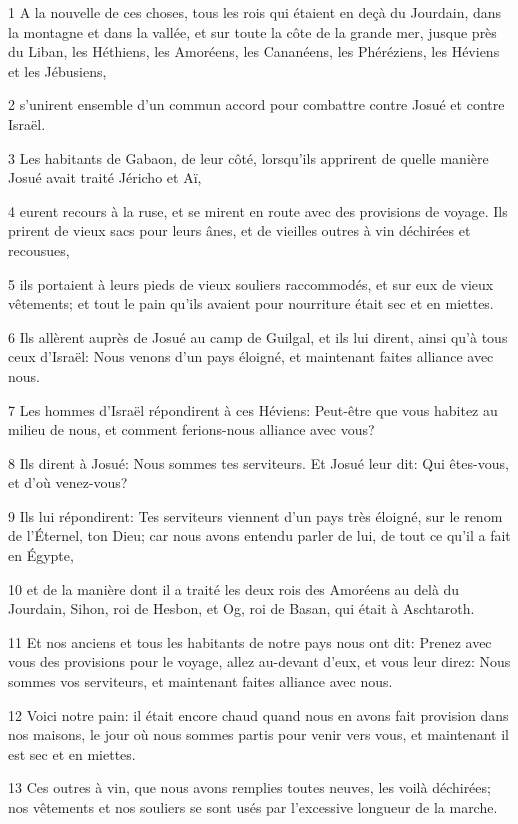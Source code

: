 \par 1 A la nouvelle de ces choses, tous les rois qui étaient en deçà du Jourdain, dans la montagne et dans la vallée, et sur toute la côte de la grande mer, jusque près du Liban, les Héthiens, les Amoréens, les Cananéens, les Phéréziens, les Héviens et les Jébusiens,
\par 2 s'unirent ensemble d'un commun accord pour combattre contre Josué et contre Israël.
\par 3 Les habitants de Gabaon, de leur côté, lorsqu'ils apprirent de quelle manière Josué avait traité Jéricho et Aï,
\par 4 eurent recours à la ruse, et se mirent en route avec des provisions de voyage. Ils prirent de vieux sacs pour leurs ânes, et de vieilles outres à vin déchirées et recousues,
\par 5 ils portaient à leurs pieds de vieux souliers raccommodés, et sur eux de vieux vêtements; et tout le pain qu'ils avaient pour nourriture était sec et en miettes.
\par 6 Ils allèrent auprès de Josué au camp de Guilgal, et ils lui dirent, ainsi qu'à tous ceux d'Israël: Nous venons d'un pays éloigné, et maintenant faites alliance avec nous.
\par 7 Les hommes d'Israël répondirent à ces Héviens: Peut-être que vous habitez au milieu de nous, et comment ferions-nous alliance avec vous?
\par 8 Ils dirent à Josué: Nous sommes tes serviteurs. Et Josué leur dit: Qui êtes-vous, et d'où venez-vous?
\par 9 Ils lui répondirent: Tes serviteurs viennent d'un pays très éloigné, sur le renom de l'Éternel, ton Dieu; car nous avons entendu parler de lui, de tout ce qu'il a fait en Égypte,
\par 10 et de la manière dont il a traité les deux rois des Amoréens au delà du Jourdain, Sihon, roi de Hesbon, et Og, roi de Basan, qui était à Aschtaroth.
\par 11 Et nos anciens et tous les habitants de notre pays nous ont dit: Prenez avec vous des provisions pour le voyage, allez au-devant d'eux, et vous leur direz: Nous sommes vos serviteurs, et maintenant faites alliance avec nous.
\par 12 Voici notre pain: il était encore chaud quand nous en avons fait provision dans nos maisons, le jour où nous sommes partis pour venir vers vous, et maintenant il est sec et en miettes.
\par 13 Ces outres à vin, que nous avons remplies toutes neuves, les voilà déchirées; nos vêtements et nos souliers se sont usés par l'excessive longueur de la marche.
